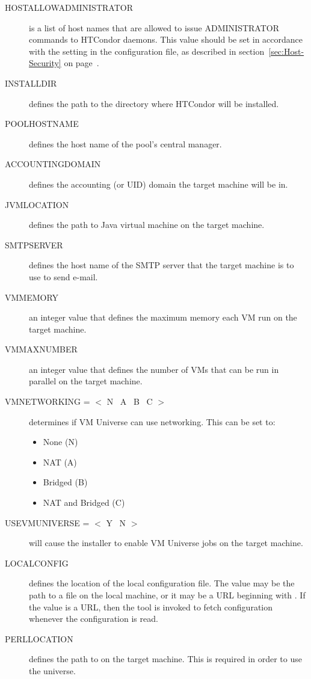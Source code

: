 \begin{description}
\item[HOSTALLOWADMINISTRATOR]
is a list of host names that are allowed to issue ADMINISTRATOR commands to
HTCondor daemons. This value should be set in accordance with the
 setting in the configuration file, 
as described in
section~\ref{sec:Host-Security} on page~\pageref{sec:Host-Security}.

\item[INSTALLDIR]
defines the path to the directory where HTCondor will be installed. 

\item[POOLHOSTNAME]
defines the host name of the pool's central manager. 

\item[ACCOUNTINGDOMAIN] 
defines the accounting (or UID) domain the target machine will be in.

\item[JVMLOCATION]
defines the path to Java virtual machine on the target machine.

\item[SMTPSERVER]
defines the host name of the SMTP server that the target machine is to
use to send e-mail.

\item [VMMEMORY]
an integer value that defines the maximum memory each VM run on the target
machine.

\item [VMMAXNUMBER]
an integer value that defines the number of VMs that can be run in parallel
on the target machine.

\item [VMNETWORKING = $<$ N \Bar\ A \Bar\ B \Bar\ C $>$]
determines if VM Universe can use networking. This can be set to:
\begin{itemize}
\item None (N)
\item NAT (A)
\item Bridged (B)
\item NAT and Bridged (C)
\end{itemize}

\item [USEVMUNIVERSE = $<$ Y \Bar\ N $>$]
will cause the installer to enable VM Universe jobs on the target machine.

\item[LOCALCONFIG]
defines the location of the local configuration file.
The value may be the path to a file on the local machine, 
or it may be a URL beginning with .
If the value is a URL, 
then the  tool is invoked to fetch configuration
whenever the configuration is read.

\item[PERLLOCATION]
defines the path to  on the target machine. This is required in
order to use the  universe.
\end{description}


